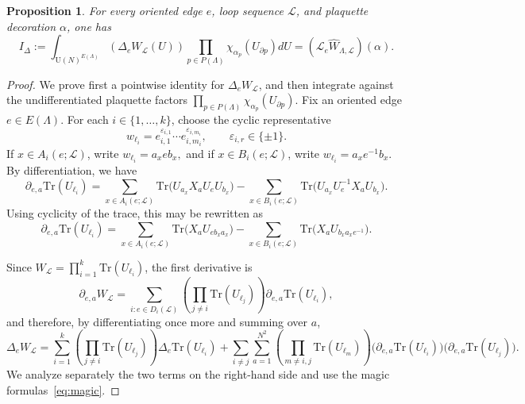 \documentclass[10pt,a4paper]{amsart}
\newtheorem{proposition}{Proposition}
\newcommand\Lc{{\mathcal{L}}}
\newcommand\Tr{\mathrm{Tr}}
\newcommand\U{{\mathrm U}}
\begin{document}
\begin{proposition}
\label{prop:universal-loop-laplacian-term}
For every oriented edge $e$, loop sequence $\Lc$, and plaquette decoration $\alpha$, one has
\[
I_\Delta:=\int_{\U(N)^{E(\Lambda)}}(\Delta_e W_{\Lc}(U))\prod_{p\in P(\Lambda)}\chi_{\alpha_p}(U_{\partial p}) dU=(\mathscr L_e \widehat{W}_{\Lambda,\Lc})(\alpha).
\]
\end{proposition}

\begin{proof}
We prove first a pointwise identity for $\Delta_eW_{\Lc}$, and then integrate against the undifferentiated plaquette factors $\prod_{p\in P(\Lambda)}\chi_{\alpha_p}(U_{\partial p})$. Fix an oriented edge $e\in E(\Lambda)$. For each $i\in\{1,\dots,k\}$, choose the cyclic representative
\[
w_{\ell_i}=e_{i,1}^{\varepsilon_{i,1}}\cdots e_{i,m_i}^{\varepsilon_{i,m_i}},\qquad \varepsilon_{i,r}\in\{\pm1\}.
\]
If $x\in A_i(e;\Lc)$, write $w_{\ell_i}=a_xeb_x,$ and if $x\in B_i(e;\Lc)$, write $w_{\ell_i}=a_xe^{-1}b_x.$ By differentiation, we have
\[
\partial_{e,a}\Tr(U_{\ell_i})=\sum_{x\in A_i(e;\Lc)}\Tr\bigl(U_{a_x}X_aU_eU_{b_x}\bigr)-\sum_{x\in B_i(e;\Lc)}\Tr\bigl(U_{a_x}U_e^{-1}X_aU_{b_x}\bigr).
\]
Using cyclicity of the trace, this may be rewritten as
\begin{equation}\label{eq:local-first-derivative-loop}
\partial_{e,a}\Tr(U_{\ell_i})=\sum_{x\in A_i(e;\Lc)} \Tr\bigl(X_aU_{e b_x a_x}\bigr)-\sum_{x\in B_i(e;\Lc)} \Tr\bigl(X_aU_{b_x a_x e^{-1}}\bigr).
\end{equation}

Since $W_{\Lc}=\prod_{i=1}^k \Tr(U_{\ell_i})$, the first derivative is
\[
\partial_{e,a}W_{\Lc}=\sum_{i:e\in D_i(\Lc)}\left(\prod_{j\neq i}\Tr(U_{\ell_j})\right)\partial_{e,a}\Tr(U_{\ell_i}),
\]
and therefore, by differentiating once more and summing over $a$,
\[
\Delta_eW_{\Lc}=\sum_{i=1}^k\left(\prod_{j\neq i}\Tr(U_{\ell_j})\right)\Delta_e\Tr(U_{\ell_i})+\sum_{i\neq j}\sum_{a=1}^{N^2}\left(\prod_{m\neq i,j}\Tr(U_{\ell_m})\right)\bigl(\partial_{e,a}\Tr(U_{\ell_i})\bigr)\bigl(\partial_{e,a}\Tr(U_{\ell_j})\bigr).
\]
We analyze separately the two terms on the right-hand side and use the magic formulas~\eqref{eq:magic}.

\smallskip


\end{proof}
\end{document}
